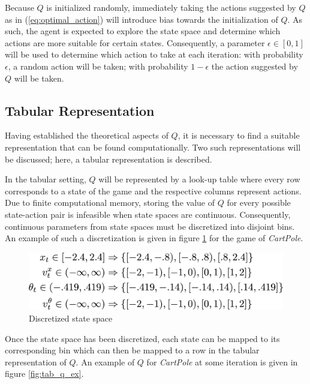 \documentclass[12pt,letterpaper]{article}
\begin{document}
Because $Q$ is initialized randomly, immediately taking the actions suggested
by $Q$ as in (\ref{eq:optimal_action}) will introduce bias towards the 
initialization of $Q$. As such, the agent is expected to explore the state space 
and determine which actions are more suitable for certain states. Consequently,
a parameter $\epsilon \in [0,1]$ will be used to determine which action to take
at each iteration: with probability $\epsilon$, a random action will be taken; 
with probability $1 - \epsilon$ the action suggested by $Q$ will be taken.

\subsection{Tabular Representation}
Having established the theoretical aspects of $Q$, it is necessary to find a 
suitable representation that can be found computationally. Two such 
representations will be discussed; here, a tabular representation is
described.

In the tabular setting, $Q$ will be represented by a look-up table where every
row corresponds to a state of the game and the respective columns represent
actions. Due to finite computational memory, storing the value of $Q$ for 
every possible state-action pair is infeasible when state spaces are continuous.
Consequently, continuous parameters from state spaces must be discretized into
disjoint bins. An example of such a discretization is given in figure 
\ref{fig:disc_state_ex} for the game of \textit{CartPole}. 

\begin{figure}[h!]
\centering\includegraphics[scale=0.25,clip]{cp_state_disc.png}
\caption{Discretized state space}
\label{fig:disc_state_ex}
\end{figure}

Once the state space has been discretized, each state can be mapped to its
corresponding bin which can then be mapped to a row in the tabular representation
of $Q$. An example of $Q$ for \textit{CartPole} at some iteration is given in 
figure \ref{fig:tab_q_ex}.
\end{document}
